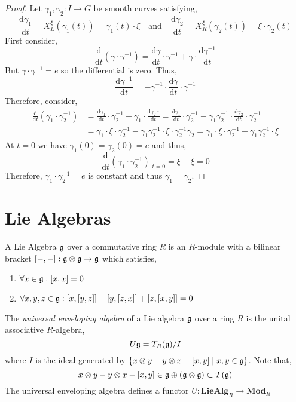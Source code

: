 \documentclass[12pt]{extarticle}
\theoremstyle{definition}
\newenvironment{definition}[1][Definition:]{\begin{trivlist}
\item[\hskip \labelsep {\bfseries #1}]}{\end{trivlist}}
\renewcommand{\d}[1]{\mathrm{d} #1}
\newcommand{\deriv}[2]{\frac{\d{#1}}{\d{#2}}}
\begin{document}
\begin{proof}
Let $\gamma_1, \gamma_2 : I \to G$ be smooth curves satisfying,
\[ \deriv{\gamma_1}{t} = X^{\xi}_L(\gamma_1(t)) = \gamma_1(t) \cdot \xi \quad \text{and} \quad \deriv{\gamma_2}{t} = X^{\xi}_R(\gamma_2(t)) = \xi \cdot \gamma_2(t) \]
First consider,
\[ \deriv{}{t} \left( \gamma \cdot \gamma^{-1} \right) = \deriv{\gamma}{t} \cdot \gamma^{-1} + \gamma \cdot \deriv{\gamma^{-1}}{t} \]
But $\gamma \cdot \gamma^{-1} = e$ so the differential is zero. Thus, 
\[ \deriv{\gamma^{-1}}{t} = - \gamma^{-1} \cdot \deriv{\gamma}{t} \cdot \gamma^{-1} \]
Therefore, consider,
\begin{align*}
\deriv{}{t} \left( \gamma_1 \cdot \gamma_2^{-1} \right) & = \deriv{\gamma_1}{t} \cdot \gamma_2^{-1} + \gamma_1 \cdot \deriv{\gamma_2^{-1}}{t} = \deriv{\gamma_1}{t} \cdot \gamma_2^{-1} - \gamma_1 \gamma_2^{-1} \cdot \deriv{\gamma_2}{t} \cdot \gamma_2^{-1} 
\\
& = \gamma_1 \cdot \xi \cdot \gamma_2^{-1} - \gamma_1 \gamma_2^{-1} \cdot \xi \cdot \gamma_2^{-1} \gamma_2 = \gamma_1 \cdot \xi \cdot \gamma_2^{-1} - \gamma_1 \gamma_2^{-1} \cdot \xi
\end{align*}
At $t = 0$ we have $\gamma_1(0) = \gamma_2(0) = e$ and thus,
\[ \deriv{}{t} \left( \gamma_1 \cdot \gamma_2^{-1} \right) \Big|_{t = 0} = \xi - \xi = 0 \]
Therefore, $\gamma_1 \cdot \gamma_2^{-1} = e$ is constant and thus $\gamma_1 = \gamma_2$. 
\end{proof}


\section{Lie Algebras}

\begin{definition}
A Lie Algebra $\mathfrak{g}$ over a commutative ring $R$ is an $R$-module with a bilinear bracket $[-,-] : \mathfrak{g} \otimes \mathfrak{g} \to \mathfrak{g}$ which satisfies,
\begin{enumerate}
\item $\forall x \in \mathfrak{g} : [x,x] = 0$
\item $\forall x,y,z \in \mathfrak{g} : [x, [y,z]] + [y, [z,x]] + [z, [x, y]] = 0$
\end{enumerate}
\end{definition}

\begin{definition}
The \textit{universal enveloping algebra} of a Lie algebra $\mathfrak{g}$ over a ring $R$ is the unital associative $R$-algebra,
\[ U \mathfrak{g} = T_R(\mathfrak{g}) / I \]
where $I$ is the ideal generated by $\{ x \otimes y - y \otimes x - [x, y] \mid x,y \in \mathfrak{g} \}$. Note that,
\[ x \otimes y - y \otimes x - [x, y] \in \mathfrak{g} \oplus (\mathfrak{g} \otimes \mathfrak{g}) \subset T(\mathfrak{g}) \]
The universal enveloping algebra defines a functor $U : \mathbf{LieAlg}_R \to \mathbf{Mod}_R$ 
\end{definition}
\end{document}
